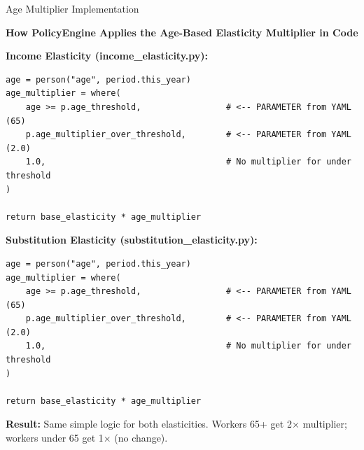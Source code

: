 \documentclass[11pt,aspectratio=169]{beamer}
\begin{document}
\begin{frame}[fragile]{Age Multiplier Implementation}
\begin{center}
\textbf{How PolicyEngine Applies the Age-Based Elasticity Multiplier in Code}
\end{center}

\vspace{0.2cm}
\tiny

\textbf{Income Elasticity (income\_elasticity.py):}
\begin{verbatim}
age = person("age", period.this_year)
age_multiplier = where(
    age >= p.age_threshold,                 # <-- PARAMETER from YAML (65)
    p.age_multiplier_over_threshold,        # <-- PARAMETER from YAML (2.0)
    1.0,                                    # No multiplier for under threshold
)

return base_elasticity * age_multiplier
\end{verbatim}

\vspace{0.2cm}

\textbf{Substitution Elasticity (substitution\_elasticity.py):}
\begin{verbatim}
age = person("age", period.this_year)
age_multiplier = where(
    age >= p.age_threshold,                 # <-- PARAMETER from YAML (65)
    p.age_multiplier_over_threshold,        # <-- PARAMETER from YAML (2.0)
    1.0,                                    # No multiplier for under threshold
)

return base_elasticity * age_multiplier
\end{verbatim}

\vspace{0.2cm}
\scriptsize
\textbf{Result:} Same simple logic for both elasticities. Workers 65+ get 2× multiplier; workers under 65 get 1× (no change).

\end{frame}
\end{document}
